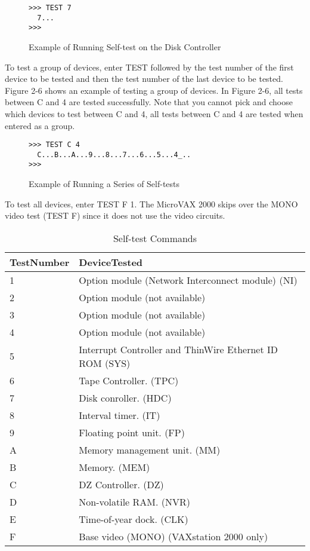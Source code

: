 \documentclass{decsectional}
\begin{document}
\begin{figure}[H]
\caption{Example of Running Self-test on the Disk Controller}
\begin{verbatim}
>>> TEST 7
  7...
>>>
\end{verbatim}
\end{figure}

To test a group of devices, enter TEST followed by the test number of the
first device to be tested and then the test number of the last device to be
tested. Figure 2-6 shows an example of testing a group of devices. In Figure
2-6, all tests between C and 4 are tested successfully. Note that you cannot
pick and choose which devices to test between C and 4, all tests between
C and 4 are tested when entered as a group.

\begin{figure}[H]
\caption{Example of Running a Series of Self-tests}
\begin{verbatim}
>>> TEST C 4
  C...B...A...9...8...7...6...5...4_..
>>>
\end{verbatim}
\end{figure}

To test all devices, enter TEST F 1. The MicroVAX 2000 skips over the
MONO video test (TEST F) since it does not use the video circuits.

\begin{table}[H]
\caption{Self-test Commands}
\label{table:3}
\begin{tabularx}{\textwidth}{p{2cm} p{8cm}}
\hline
\raggedright\textbf{Test\newline Number} & \textbf{Device\newline Tested} \\
\hline
1 & Option module (Network Interconnect module) (NI) \\
2 & Option module (not available) \\
3 & Option module (not available) \\
4 & Option module (not available) \\
5 & Interrupt Controller and ThinWire Ethernet ID ROM (SYS) \\
6 & Tape Controller. (TPC) \\
7 & Disk conroller. (HDC) \\
8 & Interval timer. (IT) \\
9 & Floating point unit. (FP) \\
A & Memory management unit. (MM) \\
B & Memory. (MEM) \\
C & DZ Controller. (DZ) \\
D & Non-volatile RAM. (NVR) \\
E & Time-of-year dock. (CLK) \\
F & Base video (MONO) (VAXstation 2000 only) \\
\hline
\end{tabularx}
\end{table}
\end{document}
